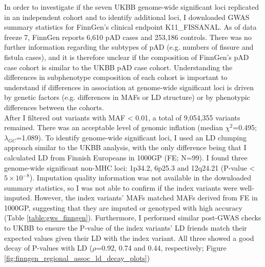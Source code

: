 In order to investigate if the seven UKBB genome-wide significant loci replicated in an independent cohort and to identify additional loci, I downloaded GWAS summary statistics for FinnGen's clinical endpoint K11\_FISSANAL. As of data freeze 7, FinnGen reports 6,610 pAD cases and 253,186 controls. There was no further information regarding the subtypes of pAD (e.g. numbers of fissure and fistula cases), and it is therefore unclear if the composition of FinnGen's pAD case cohort is similar to the UKBB pAD case cohort. Understanding the differences in subphenotype composition of each cohort is important to understand if differences in association at genome-wide significant loci is driven by genetic factors (e.g. differences in MAFs or LD structure) or by phenotypic differences between the cohorts.\\

After I filtered out variants with MAF < 0.01, a total of 9,054,355 variants remained. There was an acceptable level of genomic inflation (median $\chi^{2}$=0.495; $\lambda_{GC}$=1.089). To identify genome-wide significant loci, I used an LD clumping approach similar to the UKBB analysis, with the only difference being that I calculated LD from Finnish Europeans in 1000GP (FE; N=99). I found three genome-wide significant non-MHC loci: 1p34.2, 6p25.3 and 12q24.21 (P-value < $5\times10^{-8}$). Imputation quality information was not available in the downloaded summary statistics, so I was not able to confirm if the index variants were well-imputed. However, the index variants' MAFs matched MAFs derived from FE in 1000GP, suggesting that they are imputed or genotyped with high accuracy (Table \ref{table:gws_finngen}). Furthermore, I performed similar post-GWAS checks to UKBB to ensure the P-value of the index variants' LD friends match their expected values given their LD with the index variant. All three showed a good decay of P-values with LD ($\rho$=0.92, 0.74 and 0.44, respectively; Figure \ref{fig:finngen_regional_assoc_ld_decay_plots})

